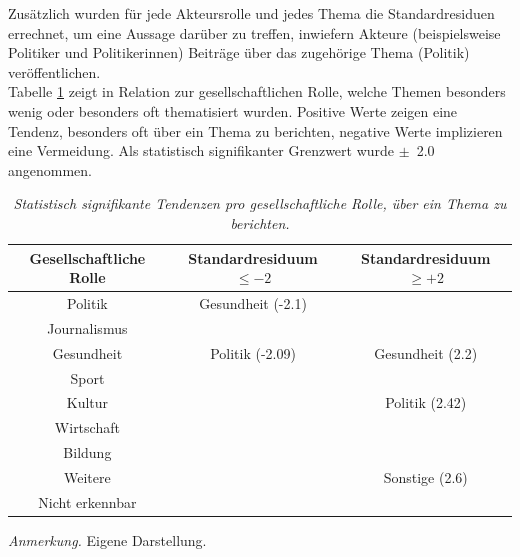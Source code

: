 \documentclass[12pt,a4paper]{article}        %
\begin{document}
Zusätzlich wurden für jede Akteursrolle und jedes Thema die Standardresiduen errechnet, um eine Aussage darüber zu treffen, inwiefern Akteure (beispielsweise Politiker und Politikerinnen) Beiträge über das zugehörige Thema (Politik) veröffentlichen. \\Tabelle \ref{tab:results_role_topic_stdres} zeigt in Relation zur gesellschaftlichen Rolle, welche Themen besonders wenig oder besonders oft thematisiert wurden. Positive Werte zeigen eine Tendenz, besonders oft über ein Thema zu berichten, negative Werte implizieren eine Vermeidung. Als statistisch signifikanter Grenzwert wurde \(\pm\) 2.0 angenommen.
\begin{table}[H]
    \caption{\textit{Statistisch signifikante Tendenzen pro gesellschaftliche Rolle, über ein Thema zu berichten.}}
    \label{tab:results_role_topic_stdres}
    \centering
    \begin{tabular}{|c|c|c|}\hline
         \textbf{Gesellschaftliche Rolle} &  Standardresiduum $\leq -2$& Standardresiduum $\geq +2$\\\hline
         Politik&  Gesundheit (-2.1)& \\\hline
         Journalismus&  & \\\hline
         Gesundheit&  Politik (-2.09)& Gesundheit (2.2)\\\hline
         Sport&  & \\\hline
         Kultur&  & Politik (2.42)\\\hline
         Wirtschaft&  & \\\hline
         Bildung&  & \\\hline
         Weitere&  & Sonstige (2.6)\\\hline
         Nicht erkennbar&  & \\ \hline
    \end{tabular}
\footnotesize\textit{Anmerkung.} Eigene Darstellung.
\end{table}
\end{document}
